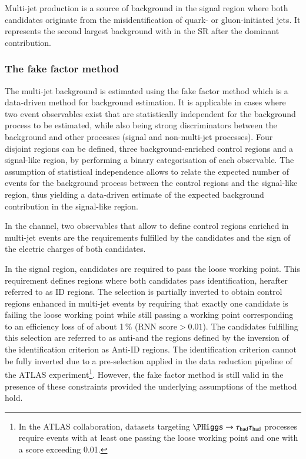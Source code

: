 \label{sec:hadhad_multijet}


Multi-jet production is a source of background in the \hadhad signal
region where both \tauhadvis candidates originate from the
misidentification of quark- or gluon-initiated jets. It represents the
second largest background with \faketauhadvis in the \hadhad SR after
the dominant \ttbarFakes contribution.

\subsubsection{The fake factor method}

The multi-jet background is estimated using the fake factor method
which is a data-driven method for background estimation. It is
applicable in cases where two event observables exist that are
statistically independent for the background process to be estimated,
while also being strong discriminators between the background and
other processes (signal and non-multi-jet processes). Four disjoint
regions can be defined, three background-enriched control regions and
a signal-like region, by performing a binary categorisation of each
observable. The assumption of statistical independence allows to
relate the expected number of events for the background process
between the control regions and the signal-like region, thus yielding
a data-driven estimate of the expected background contribution in the
signal-like region.

In the \hadhad channel, two observables that allow to define control
regions enriched in multi-jet events are the \tauid requirements
fulfilled by the \tauhadvis candidates and the sign of the electric
charges of both candidates.

In the signal region, \tauhadvis candidates are required to pass the
loose \tauid working point. This requirement defines regions where
both \tauhadvis candidates pass identification, herafter referred to
as ID regions. The selection is partially inverted to obtain control
regions enhanced in multi-jet events by requiring that exactly one
\tauhadvis candidate is failing the loose \tauid working point while
still passing a working point corresponding to an efficiency loss of
\tauhad of about 1\,\% ($\text{RNN score} > 0.01$). The \tauhadvis
candidates fulfilling this selection are referred to as
anti-\tauhadvis and the regions defined by the inversion of the
identification criterion as Anti-ID regions. The identification
criterion cannot be fully inverted due to a pre-selection applied in
the data reduction pipeline of the ATLAS experiment\footnote{In the
  ATLAS collaboration, datasets targeting $\PHiggs \to \hadhad$
  processes require events with at least one \tauhadvis passing the
  loose \tauid working point and one \tauhadvis with a \tauid score
  exceeding 0.01.}. However, the fake factor method is still valid in
the presence of these constraints provided the underlying assumptions
of the method hold.

